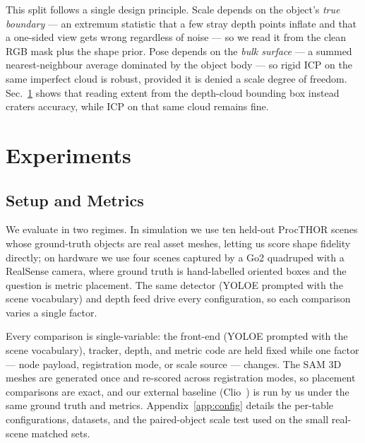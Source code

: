 \documentclass[conference]{IEEEtran}
\begin{document}
This split follows a single design principle. Scale depends on the object's
\emph{true boundary} --- an extremum statistic that a few stray depth points
inflate and that a one-sided view gets wrong regardless of noise --- so we read
it from the clean RGB mask plus the shape prior. Pose depends on the
\emph{bulk surface} --- a summed nearest-neighbour average dominated by the
object body --- so rigid ICP on the same imperfect cloud is robust, provided it
is denied a scale degree of freedom. Sec.~\ref{sec:experiments} shows that
reading extent from the depth-cloud bounding box instead craters accuracy, while
ICP on that same cloud remains fine.

\section{Experiments}
\label{sec:experiments}

\subsection{Setup and Metrics}
\label{sec:metrics}
We evaluate in two regimes. In simulation we use ten held-out ProcTHOR scenes
whose ground-truth objects are real asset meshes, letting us score shape
fidelity directly; on hardware we use four scenes captured by a Go2 quadruped
with a RealSense camera, where ground truth is hand-labelled oriented boxes and
the question is metric placement. The same detector (YOLOE prompted with the
scene vocabulary) and depth feed drive every configuration, so each comparison
varies a single factor.

Every comparison is single-variable: the front-end (YOLOE prompted with the
scene vocabulary), tracker, depth, and metric code are held fixed while one
factor --- node payload, registration mode, or scale source --- changes. The
SAM 3D meshes are generated once and re-scored across registration modes, so
placement comparisons are exact, and our external baseline (Clio~\cite{clio}) is
run by us under the same ground truth and metrics. Appendix~\ref{app:config}
details the per-table configurations, datasets, and the paired-object scale test
used on the small real-scene matched sets.
\end{document}
